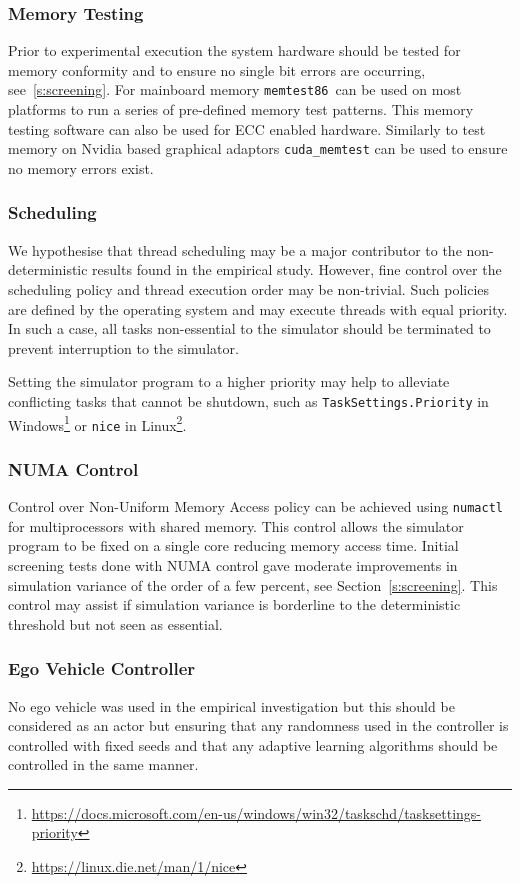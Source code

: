 \documentclass[letterpaper, 10 pt, journal, twoside]{IEEEtran}
\begin{document}
\subsubsection{Memory Testing}
Prior to experimental execution the system hardware should be tested for memory conformity and to ensure no single bit errors are occurring, see~\ref{s:screening}. For mainboard memory \texttt{memtest86}\ can be used on most platforms to run a series of pre-defined memory test patterns. This memory testing software can also be used for ECC enabled hardware. Similarly to test memory on Nvidia based graphical adaptors \texttt{cuda\_memtest} can be used to ensure no memory errors exist.


\subsubsection{Scheduling}
We hypothesise that thread scheduling may be a major contributor to the non-deterministic results found in the empirical study. However, fine control over the scheduling policy and thread execution order may be non-trivial. Such policies are defined by the operating system and may execute threads with equal priority. In such a case, all tasks non-essential to the simulator should be terminated to prevent interruption to the simulator. 

Setting the simulator program to a higher priority may help to alleviate conflicting tasks that cannot be shutdown, such as \texttt{TaskSettings.Priority} in Windows\footnote{\url{https://docs.microsoft.com/en-us/windows/win32/taskschd/tasksettings-priority}} or \texttt{nice} in Linux\footnote{\url{https://linux.die.net/man/1/nice}}.

\subsubsection{NUMA Control}
Control over Non-Uniform Memory Access policy can be achieved using \texttt{numactl} for multiprocessors with shared memory. This control allows the simulator program to be fixed on a single core reducing memory access time.
%
Initial screening tests done with NUMA control gave moderate improvements in simulation variance of the order of a few percent, see Section~\ref{s:screening}. This control may assist if simulation variance is borderline to the deterministic threshold but not seen as essential.

\subsubsection{Ego Vehicle Controller}
No ego vehicle was used in the empirical investigation but this should be considered as an actor but ensuring that any randomness used in the controller is controlled with fixed seeds and that any adaptive learning algorithms should be controlled in the same manner.
\end{document}
